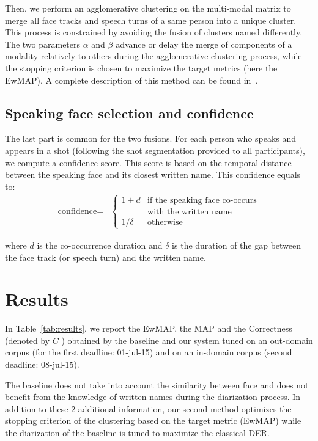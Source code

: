 \documentclass{acm_proc_article-me}
\begin{document}
Then, we perform an agglomerative clustering on the multi-modal matrix to merge all face tracks and speech turns of a same person into a unique cluster. This process is constrained by avoiding the fusion of clusters named differently. The two parameters $\alpha$ and $\beta$ advance or delay the merge of components of a modality relatively to others during the agglomerative clustering process, while the stopping criterion is chosen to maximize the target metrics (here the EwMAP). A complete description of this method can be found in~\cite{POIGNANT--MTAP--2015}.

\subsection{Speaking face selection and confidence}

The last part is common for the two fusions. For each person who speaks and appears in a shot (following the shot segmentation provided to all participants), we compute a confidence score. This score is based on the temporal distance between the speaking face and its closest written name. This confidence equals to:
\begin{align*}
  \text{confidence} = & \left\{
  	\begin{array}{ll}
  		1+d  & \mbox{if the speaking face co-occurs}  \\
  		 	 & \mbox{with the written name}		\\
  		1/\delta &\mbox{otherwise}
  	\end{array}
  \right.
\end{align*}

\noindent where $d$ is the co-occurrence duration and $\delta$ is the duration of the gap between the face track (or speech turn) and the written name.

\section{Results}

In Table~\ref{tab:results}, we report the EwMAP, the MAP and the Correctness (denoted by $C$ ) obtained by the baseline and our system tuned on an out-domain corpus (for the first deadline: 01-jul-15) and on an in-domain corpus (second deadline: 08-jul-15).

The baseline does not take into account the similarity between face and does not benefit from the knowledge of written names during the diarization process. In addition to these 2 additional information, our second method optimizes the stopping criterion of the clustering based on the target metric (EwMAP) while the diarization of the baseline is tuned to maximize the classical DER.
\end{document}
